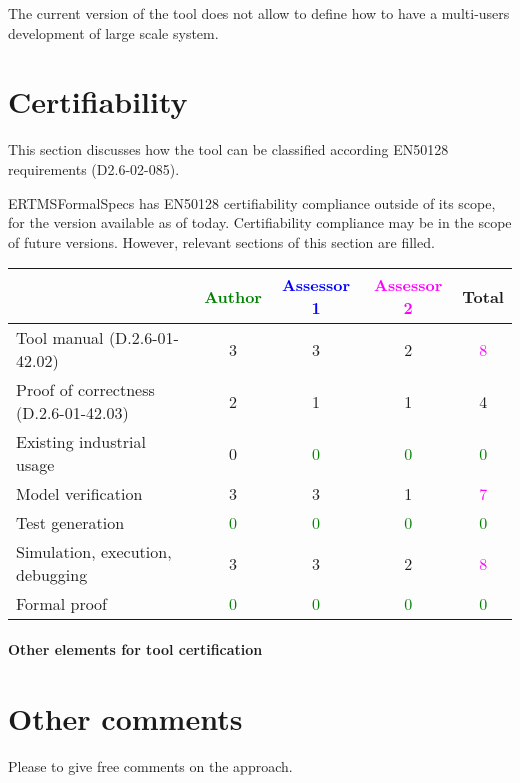 \begin{assessor2}
The current version of the tool does not allow to  define how to  have a multi-users development of large scale system.
\end{assessor2}

\section{Certifiability}

This section discusses how the tool can be classified according EN50128 requirements (D2.6-02-085).

\begin{author_comment}
ERTMSFormalSpecs has EN50128 certifiability compliance outside of its scope, for the version available as of today. Certifiability compliance may be in the scope of future versions. However, relevant sections of this section are filled.
\end{author_comment}

\begin{tabular}{|l | c | c | c | c|}
\hline
& \textcolor{green}{Author} & \textcolor{blue}{Assessor 1} & \textcolor{magenta}{Assessor 2} & Total \\
\hline 
Tool manual (D.2.6-01-42.02) & 3     & 3     & 2     & \textcolor{magenta}{8}  \\
\hline
Proof of correctness (D.2.6-01-42.03) & 2     & 1     & 1     & 4     \\
\hline
Existing industrial  usage &  0 & \textcolor{green}{0} & \textcolor{green}{0} & \textcolor{green}{0} \\
\hline
Model verification & 3     & 3     & 1     & \textcolor{magenta}{7} \\
\hline
Test generation & \textcolor{green}{0} & \textcolor{green}{0} & \textcolor{green}{0} & \textcolor{green}{0} \\
\hline
Simulation, execution, debugging & 3     & 3     & 2     & \textcolor{magenta}{8} \\
\hline
Formal proof & \textcolor{green}{0} & \textcolor{green}{0} & \textcolor{green}{0} & \textcolor{green}{0} \\
\hline
\end{tabular}

\paragraph{Other elements for tool certification}

\section{Other comments}
Please to  give free comments on the approach.

